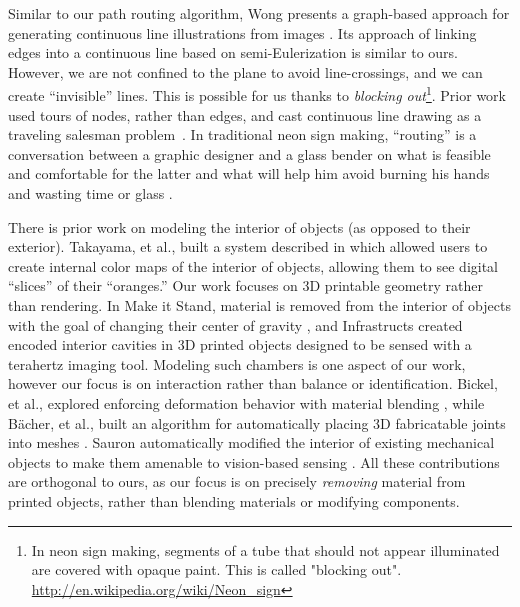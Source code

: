 Similar to our path routing algorithm, Wong presents a graph-based approach for generating continuous line illustrations from images \cite{Wong-continuousline}. Its approach of linking edges into a continuous line based on semi-Eulerization is similar to ours.  However, we are not confined to the plane to avoid line-crossings, and we can create ``invisible'' lines.  This is possible for us thanks to \emph{blocking out}\footnote{In neon sign making, segments of a tube that should not appear illuminated are covered with opaque paint. This is called "blocking out". \url{http://en.wikipedia.org/wiki/Neon_sign}}. Prior work used tours of nodes, rather than edges, and cast continuous line drawing as a traveling salesman problem~\cite{Bosch-tsp}. In traditional neon sign making, ``routing'' is a conversation between a graphic designer and a glass bender on what is feasible and comfortable for the latter and what will help him avoid burning his hands and wasting time or glass \cite{strattman1997neon}.

There is prior work on modeling the interior of objects (as opposed to their exterior).  Takayama, et al., built a system described in \cite{Takayama-fruit} which allowed users to create internal color maps of the interior of objects, allowing them to see digital ``slices'' of their ``oranges.''  Our work focuses on 3D printable geometry rather than rendering.  In Make it Stand, material is removed from the interior of objects with the goal of changing their center of gravity \cite{Prevost-makeitstand}, and Infrastructs created encoded interior cavities in 3D printed objects designed to be sensed with a terahertz imaging tool.  Modeling such chambers is one aspect of our work, however our focus is on interaction rather than balance or identification.  Bickel, et al., explored enforcing deformation behavior with material blending \cite{Bickel-deformation}, while B\"{a}cher, et al., built an algorithm for automatically placing 3D fabricatable joints into meshes \cite{Bacher-articulated}.  Sauron automatically modified the interior of existing mechanical objects to make them amenable to vision-based sensing \cite{Savage-sauron}.  All these contributions are orthogonal to ours, as our focus is on precisely \emph{removing} material from printed objects, rather than blending materials or modifying components.